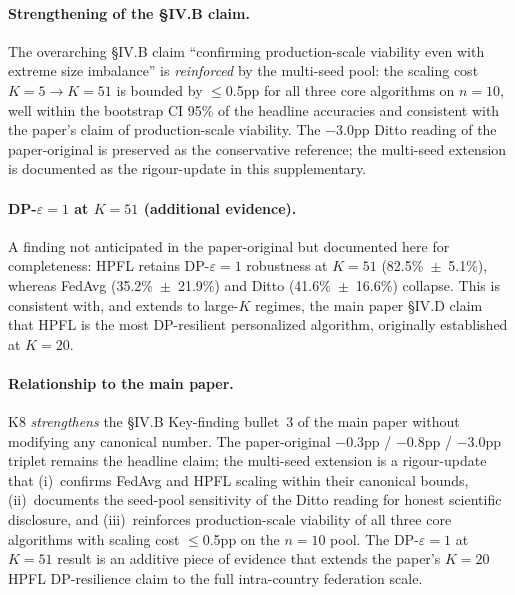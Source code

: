 \documentclass[conference]{IEEEtran}
\begin{document}
\paragraph{Strengthening of the §IV.B claim.} The overarching §IV.B claim ``confirming production-scale viability even with extreme size imbalance'' is \emph{reinforced} by the multi-seed pool: the scaling cost $K{=}5 \to K{=}51$ is bounded by $\leq$0.5pp for all three core algorithms on $n{=}10$, well within the bootstrap CI 95\% of the headline accuracies and consistent with the paper's claim of production-scale viability. The $-$3.0pp Ditto reading of the paper-original is preserved as the conservative reference; the multi-seed extension is documented as the rigour-update in this supplementary.

\paragraph{DP-$\varepsilon{=}1$ at $K{=}51$ (additional evidence).} A finding not anticipated in the paper-original but documented here for completeness: HPFL retains DP-$\varepsilon{=}1$ robustness at $K{=}51$ (82.5\%~$\pm$~5.1\%), whereas FedAvg (35.2\%~$\pm$~21.9\%) and Ditto (41.6\%~$\pm$~16.6\%) collapse. This is consistent with, and extends to large-$K$ regimes, the main paper §IV.D claim that HPFL is the most DP-resilient personalized algorithm, originally established at $K{=}20$.

\paragraph{Relationship to the main paper.} K8 \emph{strengthens} the §IV.B Key-finding bullet~3 of the main paper without modifying any canonical number. The paper-original $-$0.3pp / $-$0.8pp / $-$3.0pp triplet remains the headline claim; the multi-seed extension is a rigour-update that (i)~confirms FedAvg and HPFL scaling within their canonical bounds, (ii)~documents the seed-pool sensitivity of the Ditto reading for honest scientific disclosure, and (iii)~reinforces production-scale viability of all three core algorithms with scaling cost $\leq$0.5pp on the $n{=}10$ pool. The DP-$\varepsilon{=}1$ at $K{=}51$ result is an additive piece of evidence that extends the paper's $K{=}20$ HPFL DP-resilience claim to the full intra-country federation scale.
\end{document}
